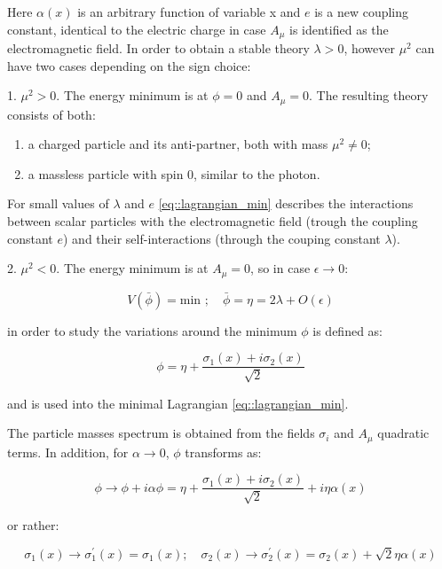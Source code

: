 Here $\alpha(x)$ is an arbitrary function of variable x and $e$ is a new coupling constant, identical to the electric charge in case $A_{\mu}$ is identified as the electromagnetic field. In order to obtain a stable theory $\lambda > 0$, however $\mu^{2}$ can have two cases depending on the sign choice:
 
1. $\mu^{2} > 0$. The energy minimum is at $\phi = 0$ and $A_{\mu} = 0$. The resulting theory consists of both:

\begin{enumerate}
	\item a charged particle and its anti-partner, both with mass $\mu^{2} \neq 0$;
	\item a massless particle with spin 0, similar to the photon.
\end{enumerate}

For small values of $\lambda$ and $e$ \autoref{eq::lagrangian_min} describes the interactions between scalar particles with the electromagnetic field (trough the coupling constant $e$) and their self-interactions (through the couping constant $\lambda$).

2. $\mu^{2} < 0$. The energy minimum is at $A_{\mu} = 0$, so in  case $\epsilon \rightarrow 0$:

\begin{equation}
V(\bar{\phi}) = \text{min }; \quad \bar{\phi}=\eta= 2\lambda +O(\epsilon)
\end{equation}
 
 in order to study the  variations around the minimum $\phi$ is defined as:

\begin{equation}
 \phi=\eta + \dfrac{\sigma_{1}(x) + i\sigma_{2}(x)}{\sqrt{2}} 
\end{equation}

and is used into the minimal Lagrangian \ref{eq::lagrangian_min}.

The particle masses spectrum is obtained from the fields $\sigma_{i}$ and $A_{\mu}$ quadratic terms. In addition, for $\alpha \rightarrow 0$, $\phi$ transforms as:

\begin{equation}
\phi \rightarrow \phi + i\alpha\phi = \eta + \dfrac{\sigma_{1}(x) + i\sigma_{2}(x)}{\sqrt{2}} + i\eta\alpha(x)
\end{equation}

or rather:

\begin{equation}
\sigma_{1}(x) \rightarrow \sigma^{\prime}_{1}(x) = σ_{1}(x); \quad \sigma_{2}(x) \rightarrow \sigma^{\prime}_{2}(x) = \sigma_{2}(x) + \sqrt{2}\eta\alpha(x)
\end{equation}

